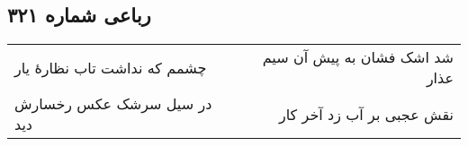 \begin{center}
\section*{رباعی شماره ۳۲۱}
\label{sec:sh321}
\begin{longtable}{l p{0.5cm} r}
چشمم که نداشت تاب نظارهٔ یار
&&
شد اشک فشان به پیش آن سیم عذار
\\
در سیل سرشک عکس رخسارش دید
&&
نقش عجبی بر آب زد آخر کار
\\
\end{longtable}
\end{center}
